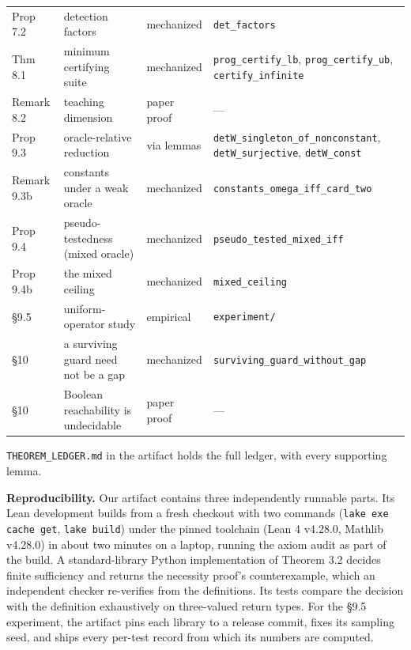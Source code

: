 \documentclass[conference]{IEEEtran}
\theoremstyle{run}
\begin{document}
\begin{table}[!t]
\begin{tabular}{L{1.9cm}L{5.4cm}L{1.7cm}L{6.9cm}}
Prop 7.2 & detection factors & mechanized & \texttt{det\_factors} \\
Thm 8.1 & minimum certifying suite & mechanized & \texttt{prog\_certify\_lb}, \texttt{prog\_certify\_ub}, \texttt{certify\_infinite} \\
Remark 8.2 & teaching dimension & paper proof & --- \\
Prop 9.3 & oracle-relative reduction & via lemmas & \texttt{detW\_singleton\_of\_nonconstant}, \texttt{detW\_surjective}, \texttt{detW\_const} \\
Remark 9.3b & constants under a weak oracle & mechanized & \texttt{constants\_omega\_iff\_card\_two} \\
Prop 9.4 & pseudo-testedness (mixed oracle) & mechanized & \texttt{pseudo\_tested\_mixed\_iff} \\
Prop 9.4b & the mixed ceiling & mechanized & \texttt{mixed\_ceiling} \\
\S 9.5 & uniform-operator study & empirical & \texttt{experiment/} \\
\S 10 & a surviving guard need not be a gap & mechanized & \texttt{surviving\_guard\_without\_gap} \\
\S 10 & Boolean reachability is undecidable & paper proof & --- \\
\bottomrule
\end{tabular}
\end{table}

\texttt{THEOREM\_LEDGER.md} in the artifact holds the full ledger, with every supporting lemma.

\textbf{Reproducibility.} Our artifact contains three independently runnable parts. Its Lean development builds from a fresh checkout with two commands (\texttt{lake exe cache get}, \texttt{lake build}) under the pinned toolchain (Lean 4 v4.28.0, Mathlib v4.28.0) in about two minutes on a laptop, running the axiom audit as part of the build. A standard-library Python implementation of Theorem 3.2 decides finite sufficiency and returns the necessity proof's counterexample, which an independent checker re-verifies from the definitions. Its tests compare the decision with the definition exhaustively on three-valued return types. For the \S 9.5 experiment, the artifact pins each library to a release commit, fixes its sampling seed, and ships every per-test record from which its numbers are computed.

\setcounter{section}{11}
\end{document}
